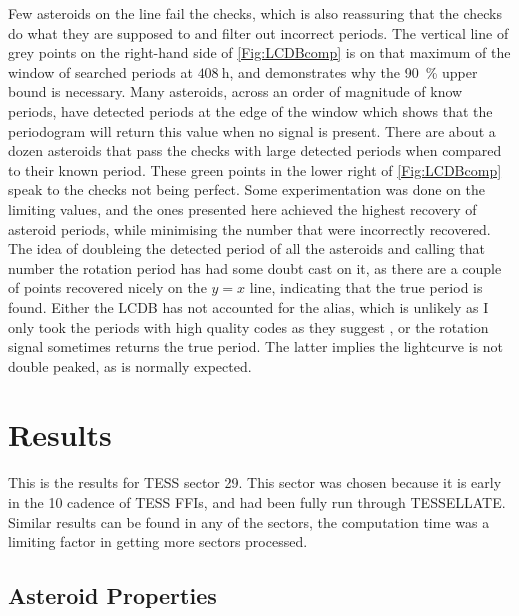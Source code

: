 \documentclass{UCreport}
\begin{document}
Few asteroids on the line fail the checks, which is also reassuring that the checks do what they are supposed to and filter out incorrect periods.
The vertical line of grey points on the right-hand side of \autoref{Fig:LCDBcomp} is on that maximum of the window of searched periods at $\qty{408}{\hour}$, and demonstrates why the \qty{90}{\percent} upper bound is necessary.
Many asteroids, across an order of magnitude of know periods, have detected periods at the edge of the window which shows that the periodogram will return this value when no signal is present.  
There are about a dozen asteroids that pass the checks with large detected periods when compared to their known period. These green points in the lower right of \autoref{Fig:LCDBcomp} speak to the checks not being perfect. 
Some experimentation was done on the limiting values, and the ones presented here achieved the highest recovery of asteroid periods, while minimising the number that were incorrectly recovered. 
The idea of doubleing the detected period of all the asteroids and calling that number the rotation period has had some doubt cast on it, as there are a couple of points recovered nicely on the $y=x$ line, indicating that the true period is found. 
Either the LCDB has not accounted for the alias, which is unlikely as I only took the periods with high quality codes as they suggest \citep{Warner2009}, or the rotation signal sometimes returns the true period.
The latter implies the lightcurve is not double peaked, as is normally expected.


\section{Results}\label{Sec:Res}

This is the results for TESS sector 29.
This sector was chosen because it is early in the \qty{10}{\min} cadence of TESS FFIs, and had been fully run through TESSELLATE.
Similar results can be found in any of the sectors, the computation time was a limiting factor in getting more sectors processed.

\subsection{Asteroid Properties}\label{SubSec:AstPropRes}
\end{document}
